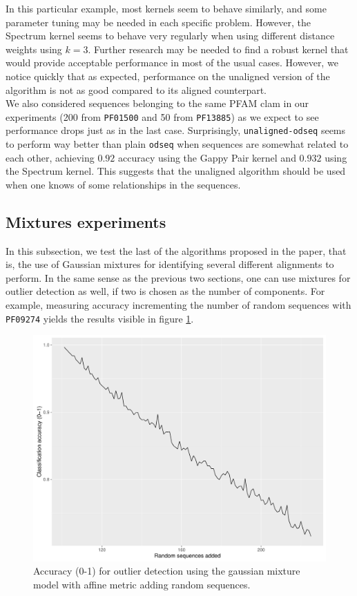 \documentclass[a4paper]{llncs}
\begin{document}
In this particular example, most kernels seem to behave similarly, and some parameter tuning may be needed in each specific problem. However, the Spectrum kernel seems to behave very regularly when using different distance weights using $k=3$. Further research may be needed to find a robust kernel that would provide acceptable performance in most of the usual cases. However, we notice quickly that as expected, performance on the unaligned version of the algorithm is not as good compared to its aligned counterpart.\\

We also considered sequences belonging to the same PFAM clam in our experiments (200 from \texttt{PF01500} and  50 from \texttt{PF13885}) as we expect to see performance drops just as in the last case. Surprisingly, \texttt{unaligned-odseq} seems to perform way better than plain \texttt{odseq} when sequences are somewhat related to each other, achieving $0.92$ accuracy using the Gappy Pair kernel and $0.932$ using the Spectrum kernel. This suggests that the unaligned algorithm should be used when one knows of some relationships in the sequences.

\subsection{Mixtures experiments}

In this subsection, we test the last of the algorithms proposed in the paper, that is, the use of Gaussian mixtures for identifying several different alignments to perform. In the same sense as the previous two sections, one can use mixtures for outlier detection as well, if two is chosen as the number of components. For example, measuring accuracy incrementing the number of random sequences with \texttt{PF09274} yields the results visible in figure \ref{fig:mixac}.\\

\begin{figure}
\centering
\includegraphics[scale=0.3]{pics/mixac}
\caption{Accuracy (0-1) for outlier detection using the gaussian mixture model with affine metric adding random sequences.}
\label{fig:mixac}
\end{figure}
\end{document}
